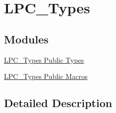\hypertarget{group___l_p_c___types}{}\section{L\+P\+C\+\_\+\+Types}
\label{group___l_p_c___types}
\subsection*{Modules}
\begin{DoxyCompactItemize}
\item 
\hyperlink{group___l_p_c___types___public___types}{L\+P\+C\+\_\+\+Types Public Types}
\item 
\hyperlink{group___l_p_c___types___public___macros}{L\+P\+C\+\_\+\+Types Public Macros}
\end{DoxyCompactItemize}


\subsection{Detailed Description}
